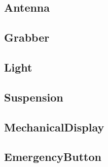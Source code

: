 \newcommand{\ExplodedView}[1]{
 \subsection{#1}
  
}

\newcommand{\ExplodedViewDrawing}[2]{
\begin{figure}[!ht]
    \centering
    \texttt{[image: \#1]}
    \caption{#2}
\end{figure}
}

\ExplodedView{Antenna}
\clearpage
\ExplodedView{Grabber}
\clearpage
\ExplodedView{Light}
\clearpage
\ExplodedView{Suspension}
\clearpage
\ExplodedView{MechanicalDisplay}
\clearpage
\ExplodedView{EmergencyButton}
